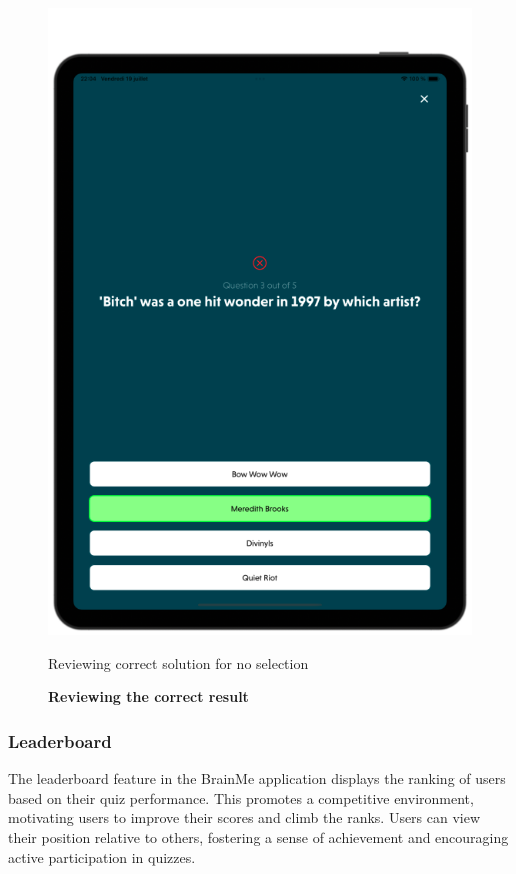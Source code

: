 \begin{figure}[H]
\begin{minipage}[b]{0.43\linewidth}
        \includegraphics[width=\linewidth]{TabletUI/Reviewing correct solution for no selection.png}
        \caption{Reviewing correct solution for no selection}
    \end{minipage}
    \vspace{0.5cm}
    \caption{\textbf{Reviewing the correct result}}
\end{figure}


\vspace{1cm}

\subsubsection{Leaderboard}

The leaderboard feature in the BrainMe application displays the ranking of users based on their quiz performance. This promotes a competitive environment, motivating users to improve their scores and climb the ranks. Users can view their position relative to others, fostering a sense of achievement and encouraging active participation in quizzes.

